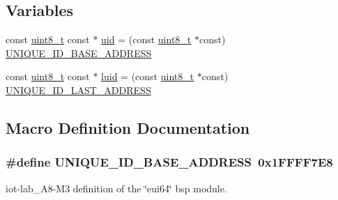 \subsection*{Variables}
\begin{DoxyCompactItemize}
\item 
const \hyperlink{_p_e___types_8h_aba7bc1797add20fe3efdf37ced1182c5}{uint8\+\_\+t} const $\ast$ \hyperlink{iot-lab___a8-_m3_2eui64_8c_a39099710e729efb534067f3d36d7f21f}{uid} = (const \hyperlink{_p_e___types_8h_aba7bc1797add20fe3efdf37ced1182c5}{uint8\+\_\+t} $\ast$const) \hyperlink{iot-lab___m3_2eui64_8c_a13ace2b7d86e7d30c89c7b1fa720859a}{U\+N\+I\+Q\+U\+E\+\_\+\+I\+D\+\_\+\+B\+A\+S\+E\+\_\+\+A\+D\+D\+R\+E\+SS}
\item 
const \hyperlink{_p_e___types_8h_aba7bc1797add20fe3efdf37ced1182c5}{uint8\+\_\+t} const $\ast$ \hyperlink{iot-lab___a8-_m3_2eui64_8c_abb80a3bafe316fa88843c9124c8c5783}{luid} = (const \hyperlink{_p_e___types_8h_aba7bc1797add20fe3efdf37ced1182c5}{uint8\+\_\+t} $\ast$const) \hyperlink{iot-lab___m3_2eui64_8c_ab59ec9c178356b200db5d5f90253b1b9}{U\+N\+I\+Q\+U\+E\+\_\+\+I\+D\+\_\+\+L\+A\+S\+T\+\_\+\+A\+D\+D\+R\+E\+SS}
\end{DoxyCompactItemize}


\subsection{Macro Definition Documentation}
\subsubsection[{\texorpdfstring{U\+N\+I\+Q\+U\+E\+\_\+\+I\+D\+\_\+\+B\+A\+S\+E\+\_\+\+A\+D\+D\+R\+E\+SS}{UNIQUE_ID_BASE_ADDRESS}}]{\setlength{\rightskip}{0pt plus 5cm}\#define U\+N\+I\+Q\+U\+E\+\_\+\+I\+D\+\_\+\+B\+A\+S\+E\+\_\+\+A\+D\+D\+R\+E\+SS~0x1\+F\+F\+F\+F7\+E8}\hypertarget{iot-lab___a8-_m3_2eui64_8c_a13ace2b7d86e7d30c89c7b1fa720859a}{}\label{iot-lab___a8-_m3_2eui64_8c_a13ace2b7d86e7d30c89c7b1fa720859a}


iot-\/lab\+\_\+\+A8-\/\+M3 definition of the \char`\"{}eui64\char`\"{} bsp module. 


